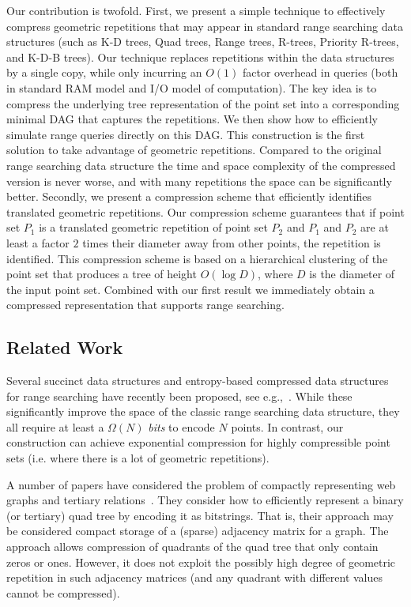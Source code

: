 Our contribution is twofold. 
First, we present a simple technique to effectively compress geometric repetitions that may appear in standard range searching data structures (such as K-D trees, Quad trees, Range trees, R-trees, Priority R-trees, and K-D-B trees). Our technique replaces repetitions within the data structures by a single copy, while only incurring an $O(1)$ factor overhead in queries (both in standard RAM model and I/O model of computation). The key idea is to compress the underlying tree representation of the point set into a corresponding minimal DAG that captures the repetitions. We then show how to efficiently simulate range queries directly on this DAG. This construction is the first solution to take advantage of geometric repetitions. Compared to the original range searching data structure the time and space complexity of the compressed version is never worse, and with many repetitions the space can be significantly better. 
Secondly, we present a compression scheme that efficiently identifies translated geometric repetitions. Our compression scheme guarantees that if point set $P_1$ is a translated geometric repetition of point set $P_2$ and $P_1$ and $P_2$ are at least a factor $2$ times their diameter away from other points, the repetition is identified. This compression scheme is based on a hierarchical clustering of the point set that produces a tree of height $O(\log D)$, where $D$ is the diameter of the input point set. Combined with our first result we immediately obtain a compressed representation that supports range searching. 


\subsection{Related Work} 
Several succinct data structures and entropy-based compressed data structures for range searching have recently been proposed, see e.g.,~\cite{makinen2007rank, bose2009succinct, barbay2010compact, farzan2014entropy}. While these significantly improve the space of the classic range searching data structure, they all require at least a $\Omega(N)$ \emph{bits} to encode $N$ points. In contrast, our construction can achieve exponential compression for highly compressible point sets (i.e. where there is a lot of geometric repetitions). 

A number of papers have considered the problem of compactly representing web graphs and tertiary relations~\cite{brisaboa2009k2, brisaboaainterleaved, de2013compact}. They consider how to efficiently represent a binary (or tertiary) quad tree by encoding it as bitstrings. That is, their approach may be considered compact storage of a (sparse) adjacency matrix for a graph. The approach allows compression of quadrants of the quad tree that only contain zeros or ones. However, it does not exploit the possibly high degree of geometric repetition in such adjacency matrices (and any quadrant with different values cannot be compressed).

